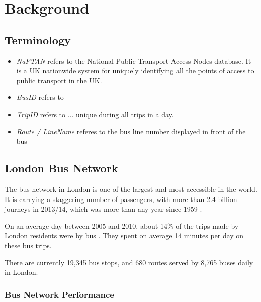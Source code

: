 \chapter{Background}

\section{Terminology}
\begin{itemize}
  \item \textit{NaPTAN} refers to the National Public Transport Access Nodes database. It is a UK nationwide system for uniquely identifying all the points of access to public transport in the UK.
	\item \textit{BusID} refers to
  \item \textit{TripID} refers to ... unique during all trips in a day.
  \item \textit{Route / LineName} referes to the bus line number displayed in front of the bus
\end{itemize}

\section{London Bus Network}

\par The bus network in London is one of the largest and most accessible in the world. It is carrying a staggering
number of passengers, with more than 2.4
billion journeys in 2013/14, which was more than any year since 1959 \cite{tfl_annual_report_13/14}.

\par On an average day between 2005 and 2010, about 14\% of the trips made by London residents were by bus \cite{tfl_ltds}. They spent on average 14 minutes per day on these bus trips.

\par There are currently 19,345 bus stops, and 680 routes served by 8,765 buses daily in London\cite{bus_stop_locations_routes}.


\subsection{Bus Network Performance}

